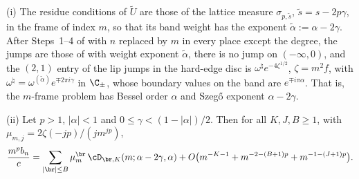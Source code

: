 \begin{lemma}\label{lem:frame}
(i) The residue conditions of $\tilde U$ are those of the lattice measure $\sigma_{p,\tilde s}$, $\tilde s=s-2p\gamma$, in the frame
of index $m$, so that its band weight has the exponent $\tilde\alpha:=\alpha-2\gamma$. After Steps~1--4 of \cite[Section~5]{PaperII} with
$n$ replaced by $m$ in every place except the degree, the jumps are those of \cite{PaperII} with weight exponent $\tilde\alpha$, there
is no jump on $(-\infty,0)$, and the $(2,1)$ entry of the lip jumps in the hard-edge disc is $\omega^\natural e^{-4\zeta^{1/2}}$,
$\zeta=m^2f$, with $\omega^\natural=\omega^{(\tilde\alpha)}e^{\mp2\pi i\gamma}$ in $\C_\pm$, whose boundary values on the band are
$e^{\mp i\pi\alpha}$. That is, the $m$-frame problem has Bessel order $\alpha$ and Szeg\H{o} exponent $\alpha-2\gamma$.

(ii) Let $p>1$, $|\alpha|<1$ and $0\le\gamma<(1-|\alpha|)/2$. Then for all $K,J,B\ge1$, with $\mu_{m,j}=2\zeta(-jp)/(jm^{jp})$,
\[
  \frac{m^pb_n}c=\sum_{|\br|\le B}\mu_m^{\br}\,\cD_{\br,K}(m;\alpha-2\gamma,\alpha)+O\bigl(m^{-K-1}+m^{-2-(B+1)p}+m^{-1-(J+1)p}\bigr).
\]
\end{lemma}

